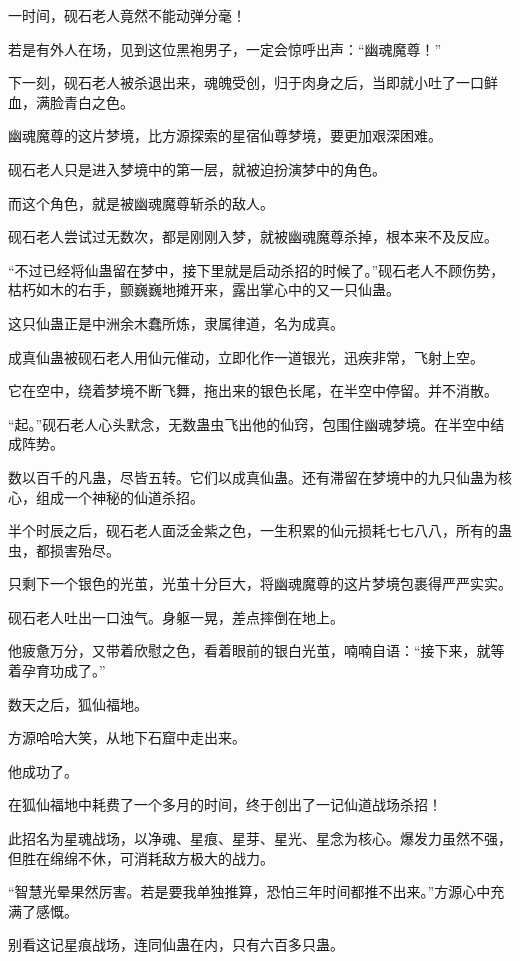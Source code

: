 \begin{this_body}
一时间，砚石老人竟然不能动弹分毫！

若是有外人在场，见到这位黑袍男子，一定会惊呼出声：“幽魂魔尊！”

下一刻，砚石老人被杀退出来，魂魄受创，归于肉身之后，当即就小吐了一口鲜血，满脸青白之色。

幽魂魔尊的这片梦境，比方源探索的星宿仙尊梦境，要更加艰深困难。

砚石老人只是进入梦境中的第一层，就被迫扮演梦中的角色。

而这个角色，就是被幽魂魔尊斩杀的敌人。

砚石老人尝试过无数次，都是刚刚入梦，就被幽魂魔尊杀掉，根本来不及反应。

“不过已经将仙蛊留在梦中，接下里就是启动杀招的时候了。”砚石老人不顾伤势，枯朽如木的右手，颤巍巍地摊开来，露出掌心中的又一只仙蛊。

这只仙蛊正是中洲余木蠢所炼，隶属律道，名为成真。

成真仙蛊被砚石老人用仙元催动，立即化作一道银光，迅疾非常，飞射上空。

它在空中，绕着梦境不断飞舞，拖出来的银色长尾，在半空中停留。并不消散。

“起。”砚石老人心头默念，无数蛊虫飞出他的仙窍，包围住幽魂梦境。在半空中结成阵势。

数以百千的凡蛊，尽皆五转。它们以成真仙蛊。还有滞留在梦境中的九只仙蛊为核心，组成一个神秘的仙道杀招。

半个时辰之后，砚石老人面泛金紫之色，一生积累的仙元损耗七七八八，所有的蛊虫，都损害殆尽。

只剩下一个银色的光茧，光茧十分巨大，将幽魂魔尊的这片梦境包裹得严严实实。

砚石老人吐出一口浊气。身躯一晃，差点摔倒在地上。

他疲惫万分，又带着欣慰之色，看着眼前的银白光茧，喃喃自语：“接下来，就等着孕育功成了。”

数天之后，狐仙福地。

方源哈哈大笑，从地下石窟中走出来。

他成功了。

在狐仙福地中耗费了一个多月的时间，终于创出了一记仙道战场杀招！

此招名为星魂战场，以净魂、星痕、星芽、星光、星念为核心。爆发力虽然不强，但胜在绵绵不休，可消耗敌方极大的战力。

“智慧光晕果然厉害。若是要我单独推算，恐怕三年时间都推不出来。”方源心中充满了感慨。

别看这记星痕战场，连同仙蛊在内，只有六百多只蛊。


\end{this_body}
